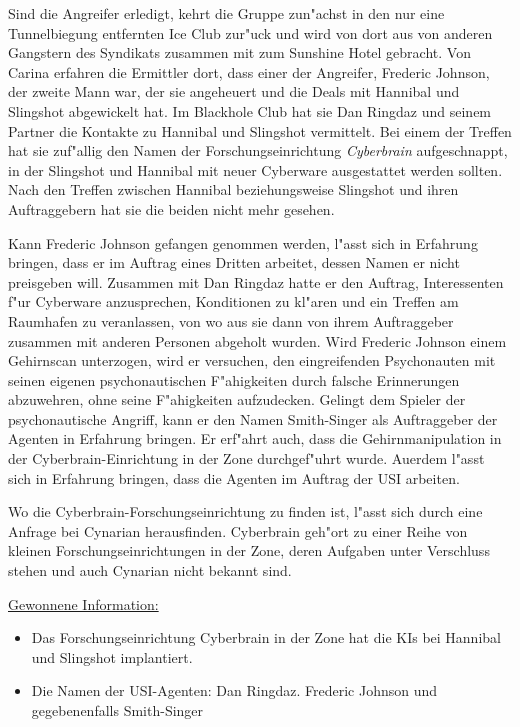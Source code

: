 Sind die Angreifer erledigt, kehrt die Gruppe zun"achst in den nur eine Tunnelbiegung entfernten Ice Club zur"uck und wird von dort aus von anderen Gangstern des Syndikats zusammen mit \xl{} zum Sunshine Hotel gebracht. Von Carina erfahren die Ermittler dort, dass einer der Angreifer, Frederic Johnson, der zweite Mann war, der sie angeheuert und die Deals mit Hannibal und Slingshot abgewickelt hat. Im Blackhole Club hat sie Dan Ringdaz und seinem Partner die Kontakte zu Hannibal und Slingshot vermittelt. Bei einem der Treffen hat sie zuf"allig den Namen der Forschungseinrichtung \emph{Cyberbrain} aufgeschnappt, in der Slingshot und Hannibal mit neuer Cyberware ausgestattet werden sollten. Nach den Treffen zwischen Hannibal beziehungsweise Slingshot und ihren Auftraggebern hat sie die beiden nicht mehr gesehen.

Kann Frederic Johnson gefangen genommen werden, l"asst sich in Erfahrung bringen, dass er im Auftrag eines Dritten arbeitet, dessen Namen er nicht preisgeben will. Zusammen mit Dan Ringdaz hatte er den Auftrag, Interessenten f"ur Cyberware anzusprechen, Konditionen zu kl"aren und ein Treffen am Raumhafen zu veranlassen, von wo aus sie dann von ihrem Auftraggeber zusammen mit anderen Personen abgeholt wurden. Wird Frederic Johnson einem Gehirnscan unterzogen, wird er versuchen, den eingreifenden Psychonauten mit seinen eigenen psychonautischen F"ahigkeiten durch falsche Erinnerungen abzuwehren, ohne seine F"ahigkeiten aufzudecken. Gelingt dem Spieler der psychonautische Angriff, kann er den Namen Smith-Singer als Auftraggeber der Agenten in Erfahrung bringen. Er erf"ahrt auch, dass die Gehirnmanipulation in der Cyberbrain-Einrichtung in der Zone durchgef"uhrt wurde. Au\3erdem l"asst sich in Erfahrung bringen, dass die Agenten im Auftrag der USI arbeiten.

Wo die Cyberbrain-Forschungseinrichtung zu finden ist, l"asst sich durch eine Anfrage bei Cynarian herausfinden. Cyberbrain geh"ort zu einer Reihe von kleinen Forschungseinrichtungen in der Zone, deren Aufgaben unter Verschluss stehen und auch Cynarian nicht bekannt sind.

\begin{remarks}
	\underline{Gewonnene Information:}
	
	\begin{itemize}
		\item Das Forschungseinrichtung Cyberbrain in der Zone hat die KIs bei Hannibal und Slingshot implantiert.
		\item Die Namen der USI-Agenten: Dan Ringdaz. Frederic Johnson und gegebenenfalls Smith-Singer
	\end{itemize}
\end{remarks}
